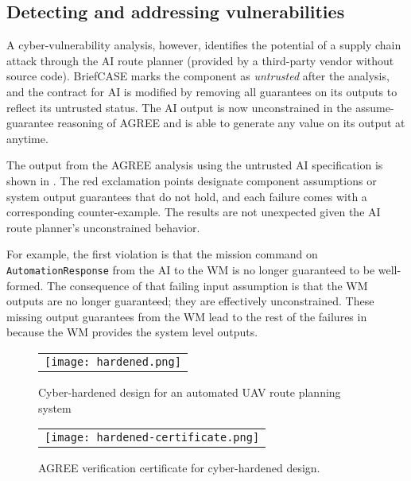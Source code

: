 \subsection{Detecting and addressing vulnerabilities}
A cyber-vulnerability analysis, however, identifies the potential of a
supply chain attack through the AI route planner (provided by a
third-party vendor without source code).  BriefCASE marks the
component as \emph{untrusted} after the analysis, and the contract for
AI is modified by removing all guarantees on its outputs to reflect
its untrusted status.  The AI output is now unconstrained in the
assume-guarantee reasoning of AGREE and is able to generate any value
on its output at anytime.

The output from the AGREE analysis using the untrusted AI
specification is shown in .  The red
exclamation points designate component assumptions or system output
guarantees that do not hold, and each failure comes with a
corresponding counter-example.  The results are not unexpected given
the AI route planner's unconstrained behavior.

For example, the first violation is that the mission command on \texttt{AutomationResponse} from
the AI to the WM is no longer guaranteed to be well-formed.  The
consequence of that failing input assumption is that the WM outputs
are no longer guaranteed; they are effectively unconstrained.  These
missing output guarantees from the WM lead to the rest of the failures
in  because the WM provides the system
level outputs.

\begin{figure*}
  \begin{center}
    \begin{tabular}{c}
      \texttt{[image: hardened.png]}
    \end{tabular}
  \end{center}
  \caption{Cyber-hardened design for an automated UAV route planning system}
  \label{fig:hardened}
\end{figure*}

\begin{figure}
  \begin{center}
    \begin{tabular}{c}
      \texttt{[image: hardened-certificate.png]}
    \end{tabular}
  \end{center}
  \caption{AGREE verification certificate for cyber-hardened design.}
  \label{fig:hardened-certificate}
\end{figure}


